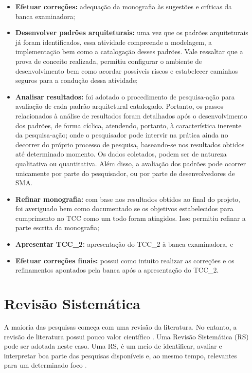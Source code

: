 \begin{itemize}
    \item \textbf{Efetuar correções:} adequação da monografia às sugestões e críticas da banca examinadora;
    \item \textbf{Desenvolver padrões arquiteturais:} uma vez que os padrões arquiteturais já foram identificados, essa atividade compreende a modelagem, a implementação bem como a catalogação desses padrões. Vale ressaltar que a prova de conceito realizada, permitiu configurar o ambiente de desenvolvimento bem como acordar possíveis riscos e estabelecer caminhos seguros para a condução dessa atividade;
    \item \textbf{Analisar resultados:} foi adotado o procedimento de pesquisa-ação para avaliação de cada padrão arquitetural catalogado. Portanto, os passos relacionados à análise de resultados foram detalhados após o desenvolvimento dos padrões, de forma cíclica, atendendo, portanto, à característica inerente da pesquisa-ação; onde o pesquisador pode intervir na prática ainda no decorrer do próprio processo de pesquisa, baseando-se nos resultados obtidos até determinado momento. Os dados coletados, podem ser de natureza qualitativa ou quantitativa. Além disso, a avaliação dos padrões pode ocorrer unicamente por parte do pesquisador, ou por parte de desenvolvedores de SMA. 
    \item \textbf{Refinar monografia:} com base nos resultados obtidos ao final do projeto, foi averiguado bem como documentado se os objetivos estabelecidos para cumprimento no TCC como um todo foram atingidos. Isso permitiu refinar a parte escrita da monografia;
    \item \textbf{Apresentar TCC\_2:} apresentação do TCC\_2 à banca examinadora, e
    \item \textbf{Efetuar correções finais:} possui como intuito realizar as correções e os refinamentos apontados pela banca após a apresentação do TCC\_2.

\end{itemize}

\section{Revisão Sistemática}\label{sec:proc_rs}

A maioria das pesquisas começa com uma revisão da literatura. No entanto, a revisão de literatura possui pouco valor científico \cite{kitchenham2004}. Uma Revisão Sistemática (RS) pode ser adotada neste caso. Uma RS, é um meio de identificar, avaliar e interpretar boa parte das pesquisas disponíveis e, ao mesmo tempo, relevantes para um determinado foco \cite{kitchenham2004}. 

